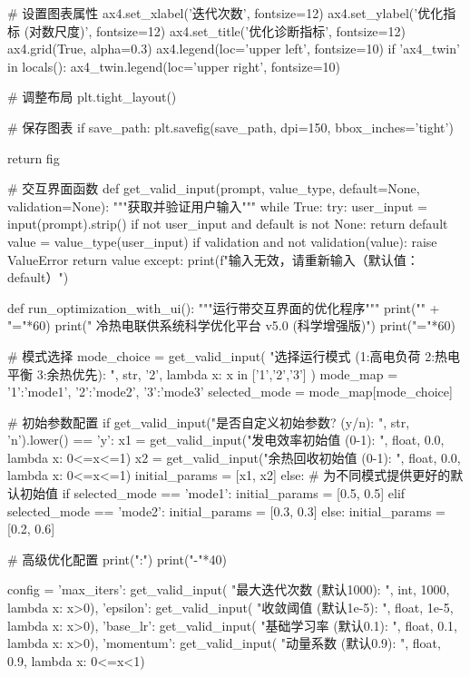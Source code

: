 \documentclass[a4paper,12pt]{article}
\begin{document}
\begin{python}
        # 设置图表属性
        ax4.set_xlabel('迭代次数', fontsize=12)
        ax4.set_ylabel('优化指标 (对数尺度)', fontsize=12)
        ax4.set_title('优化诊断指标', fontsize=12)
        ax4.grid(True, alpha=0.3)
        ax4.legend(loc='upper left', fontsize=10)
        if 'ax4_twin' in locals():
            ax4_twin.legend(loc='upper right', fontsize=10)
        
        # 调整布局
        plt.tight_layout()
        
        # 保存图表
        if save_path:
            plt.savefig(save_path, dpi=150, bbox_inches='tight')
        
        return fig
        
# 交互界面函数
def get_valid_input(prompt, value_type, default=None, validation=None):
    """获取并验证用户输入"""
    while True:
        try:
            user_input = input(prompt).strip()
            if not user_input and default is not None:
                return default
            value = value_type(user_input)
            if validation and not validation(value):
                raise ValueError
            return value
        except:
            print(f"输入无效，请重新输入（默认值：{default}）")

def run_optimization_with_ui():
    """运行带交互界面的优化程序"""
    print("\n" + "="*60)
    print("     冷热电联供系统科学优化平台 v5.0 (科学增强版)")
    print("="*60)
    
    # 模式选择
    mode_choice = get_valid_input(
        "选择运行模式 (1:高电负荷 2:热电平衡 3:余热优先): ",
        str, '2', lambda x: x in ['1','2','3']
    )
    mode_map = {'1':'mode1', '2':'mode2', '3':'mode3'}
    selected_mode = mode_map[mode_choice]
    
    # 初始参数配置
    if get_valid_input("是否自定义初始参数? (y/n): ", str, 'n').lower() == 'y':
        x1 = get_valid_input("发电效率初始值 (0-1): ", float, 0.0, lambda x: 0<=x<=1)
        x2 = get_valid_input("余热回收初始值 (0-1): ", float, 0.0, lambda x: 0<=x<=1)
        initial_params = [x1, x2]
    else:
        # 为不同模式提供更好的默认初始值
        if selected_mode == 'mode1':
            initial_params = [0.5, 0.5]
        elif selected_mode == 'mode2':
            initial_params = [0.3, 0.3]
        else:
            initial_params = [0.2, 0.6]
    
    # 高级优化配置
    print(":")
    print("-"*40)
    
    config = {
        'max_iters': get_valid_input(
            "最大迭代次数 (默认1000): ", int, 1000, lambda x: x>0),
        'epsilon': get_valid_input(
            "收敛阈值 (默认1e-5): ", float, 1e-5, lambda x: x>0),
        'base_lr': get_valid_input(
            "基础学习率 (默认0.1): ", float, 0.1, lambda x: x>0),
        'momentum': get_valid_input(
            "动量系数 (默认0.9): ", float, 0.9, lambda x: 0<=x<1)
    }
    

\end{python}
\end{document}
